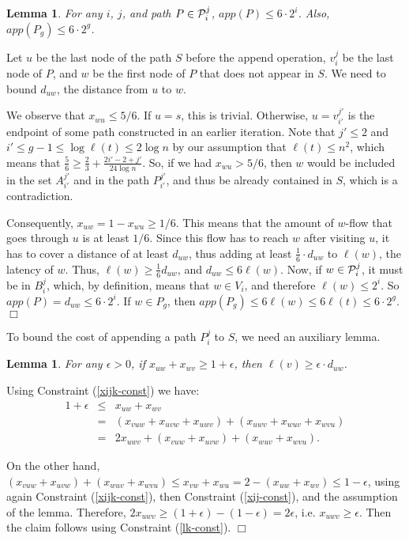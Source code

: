 \documentclass[11pt]{article}
\newcommand{\qed}{\hspace*{\fill}$\Box$}
\newtheorem{lemma}[theorem]{Lemma}
\newenvironment{proof}[1][Proof. ]{\noindent {\bf #1 }}{\qed}
\begin{document}
\begin{lemma} \label{lem:app-p}
For any $i$, $j$, and path $P\in {\cal P}^j_i$, $app(P)\leq 6\cdot 2^i$. Also, $app(P_g) \leq 6 \cdot 2^g$.
\end{lemma}
\begin{proof}
Let $u$ be the last node of the path $S$ before the append operation, $v^j_i$ be the last node of $P$, and $w$ be the first node of $P$ that does not appear in $S$. We need to bound $d_{uw}$, the distance from $u$ to $w$. 

We observe that $x_{wu} \leq 5/6$. If $u=s$, this is trivial. Otherwise, $u=v^{j'}_{i'}$ is the endpoint of some path constructed in an earlier iteration. Note that  $j'\leq 2$ and  $i'\leq g-1 \leq \log \ell(t) \leq 2 \log n$ by our assumption that $\ell(t)\leq n^2$, which means that $\frac{5}{6} \geq \frac{2}{3}+\frac{2i'-2+j'}{24\log n}$. So, if we had $x_{wu} > 5/6$, then $w$ would be included in the set $A^{j'}_{i'}$ and in the path $P^{j'}_{i'}$, and thus be already contained in $S$, which is a contradiction.

Consequently, $x_{uw} = 1 - x_{wu} \geq 1/6$. 
This means that the amount of $w$-flow that goes through $u$ is at least $1/6$. Since this flow has to reach $w$ after visiting $u$, it has to cover a distance of at least $d_{uw}$, thus adding at least $\frac{1}{6}\cdot d_{uw}$ to $\ell(w)$, the latency of $w$. Thus, $\ell(w)\geq \frac{1}{6} d_{uw}$, and $d_{uw} \leq 6 \ell(w)$. Now, if $w\in {\cal P}^j_i$, it must be in $B^j_i$, which, by definition, means that $w\in V_i$, and therefore $\ell(w)\leq 2^i$. So $app(P) = d_{uw}\leq 6\cdot 2^i$. If $w\in P_g$, then $app(P_g) \leq 6 \ell(w) \leq 6 \ell(t) \leq 6\cdot 2^g$.
\end{proof}

\medskip



To bound the cost of appending a path $P^j_i$ to $S$, we need an auxiliary lemma.

\begin{lemma} \label{lem:ijk}
For any $\epsilon > 0$, if $x_{uw}+x_{wv} \geq 1+\epsilon$, then $\ell(v) \geq \epsilon \cdot d_{uw}$.
\end{lemma}
\begin{proof}
Using Constraint (\ref{xijk-const}) we have:
\begin{eqnarray*}
1+\epsilon &\leq& x_{uw} + x_{wv}   \\
&=& (x_{vuw} + x_{uvw} + x_{uwv}) 
  + (x_{uwv} + x_{wuv} + x_{wvu}) \\
 & = &  2 x_{uwv} + (x_{vuw} + x_{uvw})  + (x_{wuv} + x_{wvu}).
\end{eqnarray*}

On the other hand, $(x_{vuw} + x_{uvw}) + (x_{wuv} + x_{wvu}) \leq x_{vw} + x_{wu} = 2 - (x_{uw} + x_{wv}) \leq 1-\epsilon$, 
using again Constraint (\ref{xijk-const}), then Constraint (\ref{xij-const}), and the assumption of the lemma.
Therefore,  $2 x_{uwv} \geq (1+\epsilon) - (1-\epsilon) = 2\epsilon$, i.e. $x_{uwv} \geq \epsilon$.  
Then the claim follows using Constraint (\ref{lk-const}).
\end{proof}
\end{document}
